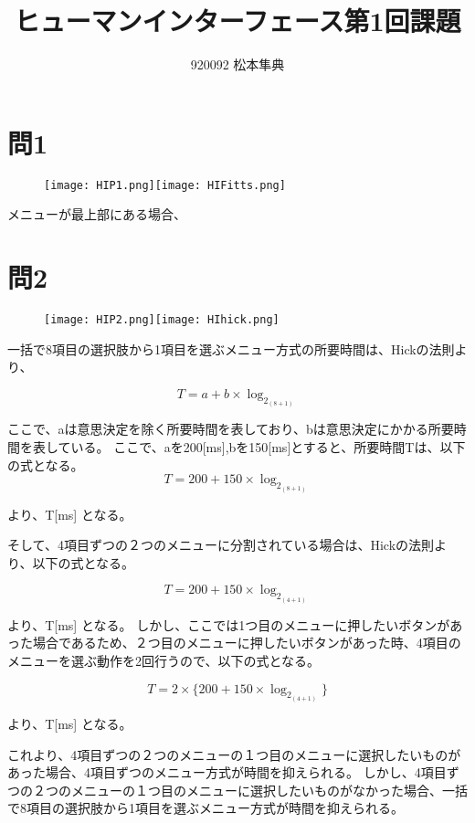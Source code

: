 \documentclass[uplatex,dvipdfmx]{jsarticle}
\title{ヒューマンインターフェース第1回課題}
\author{920092 松本隼典}
\begin{document}
\maketitle

\section{問1}

\begin{figure}[htbp]
    \centering
    \texttt{[image: HIP1.png]}\texttt{[image: HIFitts.png]}
    \label{fig:my_label}
\end{figure}

メニューが最上部にある場合、
\section{問2}
\begin{figure}[htbp]
    \centering
    \texttt{[image: HIP2.png]}\texttt{[image: HIhick.png]}
    \label{fig:my_label}
\end{figure}

一括で8項目の選択肢から1項目を選ぶメニュー方式の所要時間は、Hickの法則より、

\begin{equation}
    T=a+b \times \log_2_ (8+1)
\end{equation}

ここで、aは意思決定を除く所要時間を表しており、bは意思決定にかかる所要時間を表している。
ここで、aを200[ms],bを150[ms]とすると、所要時間Tは、以下の式となる。
\begin{equation}
    T=200+150 \times \log_2_ (8+1)
\end{equation}

より、T[ms]  となる。


そして、4項目ずつの２つのメニューに分割されている場合は、Hickの法則より、以下の式となる。

\begin{equation}
    T=200+150 \times \log_2_ (4+1)
\end{equation}

より、T[ms]  となる。
しかし、ここでは1つ目のメニューに押したいボタンがあった場合であるため、２つ目のメニューに押したいボタンがあった時、4項目のメニューを選ぶ動作を2回行うので、以下の式となる。

\begin{equation}
    T=2\times \lbrace200+150 \times \log_2_ (4+1)\rbrace
\end{equation}

より、T[ms]  となる。


これより、4項目ずつの２つのメニューの１つ目のメニューに選択したいものがあった場合、4項目ずつのメニュー方式が時間を抑えられる。
しかし、4項目ずつの２つのメニューの１つ目のメニューに選択したいものがなかった場合、一括で8項目の選択肢から1項目を選ぶメニュー方式が時間を抑えられる。
\end{document}
